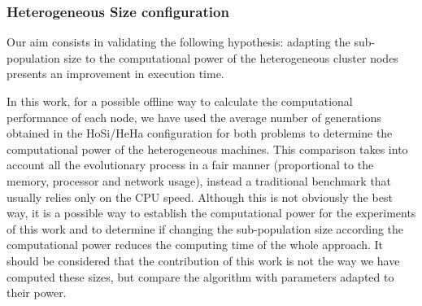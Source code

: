 \documentclass[final,1p,times]{elsarticle}
\begin{document}
\begin{table}
\end{table}


\subsubsection{Heterogeneous Size configuration}

Our aim consists in validating the following hypothesis: adapting the sub-population size to the computational power of the heterogeneous cluster nodes presents an improvement in execution time. 


In this work, for a possible offline way to calculate the computational performance of each node, we have used the average number of generations obtained in the HoSi/HeHa configuration for both problems to determine the computational power of the heterogeneous machines. This comparison takes into account all the evolutionary process in a fair manner (proportional to the memory, processor and network usage), instead a traditional benchmark that usually relies only on the CPU speed. Although this is not obviously the best way, it is a possible way to establish the computational power for the experiments of this work and to determine if changing the sub-population size according the computational power reduces the computing time of the whole approach. It should be considered that the contribution of this work is not the way we have computed these sizes, but compare the algorithm with parameters adapted to their power.
\end{document}

